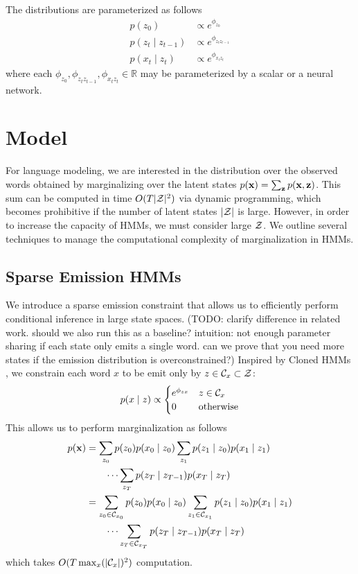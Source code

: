 \documentclass[11pt,a4paper]{article}
\begin{document}
The distributions are parameterized as follows
\begin{equation}
\label{param}
\begin{aligned}
p(z_0) &\propto e^{\phi_{z_0}}\\
p(z_t \mid z_{t-1}) &\propto e^{\phi_{z_tz_{t-1}}}\\
p(x_t \mid z_t) &\propto e^{\phi_{x_tz_t}}
\end{aligned}
\end{equation}
where each $\phi_{z_0},\phi_{z_tz_{t-1}},\phi_{x_tz_t} \in \mathbb{R}$
may be parameterized by a scalar or a neural network.

\section{Model}
For language modeling, we are interested in the distribution over the observed words
obtained by marginalizing over the latent states $p(\mathbf{x}) = \sum_{\mathbf{z}}p(\mathbf{x},\mathbf{z})$.
This sum can be computed in time $O(T|\mathcal{Z}|^2)$ via dynamic programming,
which becomes prohibitive if the number of latent states $|\mathcal{Z}|$ is large.
However, in order to increase the capacity of HMMs, we must consider large $\mathcal{Z}$.
We outline several techniques to manage the computational complexity of marginalization in HMMs.  

\subsection{Sparse Emission HMMs}
We introduce a sparse emission constraint that allows us to
efficiently perform conditional inference in large state spaces.
(TODO: clarify difference in related work. should we also run this as a baseline?
intuition: not enough parameter sharing if each state only emits a single word.
can we prove that you need more states if the emission distribution is overconstrained?)
Inspired by Cloned HMMs \citep{dedieu2019learning},
we constrain each word $x$ to be emit only by $z \in \mathcal{C}_x \subset \mathcal{Z}$:
\begin{equation}
\label{eqn:sparse_emission}
p(x \mid z) \propto \begin{cases}
e^{\phi_{zx}} & z \in \mathcal{C}_x \\
0 & \textrm{otherwise}
\end{cases}
\end{equation}
This allows us to perform marginalization as follows
\begin{equation}
\label{eqn:sparse_marginalization}
\begin{aligned}
p(\mathbf{x}) &= \sum_{z_0} p(z_0)p(x_0 \mid z_0)
    \sum_{z_1}p(z_1\mid z_0)p(x_1 \mid z_1)\\
    &\qquad\cdots
    \sum_{z_T}p(z_T \mid z_{T-1})p(x_T \mid z_T)\\
&= \sum_{z_0 \in \mathcal{C}_{x_0}} p(z_0)p(x_0 \mid z_0)
    \sum_{z_1 \in \mathcal{C}_{x_1}} p(z_1\mid z_0)p(x_1 \mid z_1)\\
    &\qquad\cdots
    \sum_{z_T \in \mathcal{C}_{x_T}} p(z_T \mid z_{T-1})p(x_T \mid z_T)
\end{aligned}
\end{equation}
which takes $O(T \max_x(|\mathcal{C}_x|)^2)$ computation.
\end{document}
